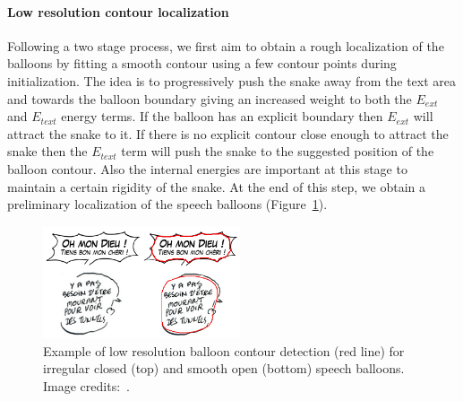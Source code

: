 \paragraph{Low resolution contour localization}
Following a two stage process, we first aim to obtain a rough localization of the balloons by fitting a smooth contour using a few contour points during initialization.
The idea is to progressively push the snake away from the text area and towards the balloon boundary giving an increased weight to both the $E_{ext}$ and $E_{text}$ energy terms.
If the balloon has an explicit boundary then $E_{ext}$ will attract the snake to it.
If there is no explicit contour close enough to attract the snake then the $E_{text}$ term will push the snake to the suggested position of the balloon contour.
Also the internal energies are important at this stage to maintain a certain rigidity of the snake.
At the end of this step, we obtain a preliminary localization of the speech balloons (Figure~\ref{fig:se:mono_res_det}). 

	\begin{figure}[!ht]	%
	  \centering
		\includegraphics[trim = 0mm 3mm 0mm 1mm, clip, width=220px]{mono_res_det.png}
		\caption[Examples of low resolution contour detection for balloon extraction]{Example of low resolution balloon contour detection (red line) for irregular closed (top) and smooth open (bottom) speech balloons. Image credits:~\cite{EtPisTaf12,Montaine11}.}
		\label{fig:se:mono_res_det}
	\end{figure}


